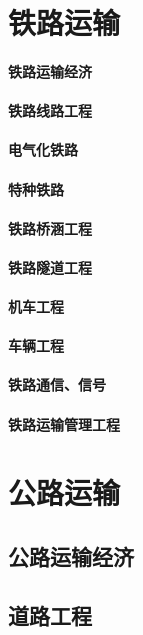 \documentclass[UTF8]{../ApplicationUniverse}
\begin{document}
\chapter{铁路运输}
\subsubsection{铁路运输经济}
\subsubsection{铁路线路工程}
\subsubsection{电气化铁路}
\subsubsection{特种铁路}
\subsubsection{铁路桥涵工程}
\subsubsection{铁路隧道工程}
\subsubsection{机车工程}
\subsubsection{车辆工程}
\subsubsection{铁路通信、信号}
\subsubsection{铁路运输管理工程}



\chapter{公路运输}
\section{公路运输经济}
\section{道路工程}
\end{document}
